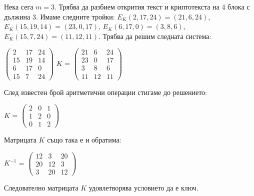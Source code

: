 \documentclass{article}
\begin{document}
\justify
Нека сега $m = 3$. Трябва да разбием открития текст и криптотекста на 4 блока с дължина 3. Имаме следните тройки: $E_K(2,17,24) = (21,6,24)$, $E_K(15,19,14) = (23,0,17)$, $E_K(6,17,0) = (3,8,6)$, $E_K(15,7,24) = (11,12,11)$. Трябва да решим следната система: 

\begin{center}
    $\begin{pmatrix}
        2 & 17 & 24 \\
        15 & 19 & 14 \\
        6 & 17 & 0 \\
        15 & 7 & 24
    \end{pmatrix}$ $K$ = $\begin{pmatrix}
                            21 & 6 & 24 \\
                            23 & 0 & 17 \\
                            3 & 8 & 6 \\
                            11 & 12 & 11
                         \end{pmatrix}$
\end{center}

\justify
След известен брой аритметични операции стигаме до решението:

\begin{center}
    $K$ = $\begin{pmatrix}
        2 & 0 & 1 \\
        1 & 2 & 0 \\
        0 & 1 & 2
    \end{pmatrix}$
\end{center}

\justify
Матрицата $K$ също така е и обратима: 

\begin{center}
    $K^{-1}$ = $\begin{pmatrix}
        12 & 3 & 20 \\
        20 & 12 & 3 \\
        3 & 20 & 12
    \end{pmatrix}$
\end{center}

\justify
Следователно матрицата $K$ удовлетворява условието да е ключ. 
\end{document}
